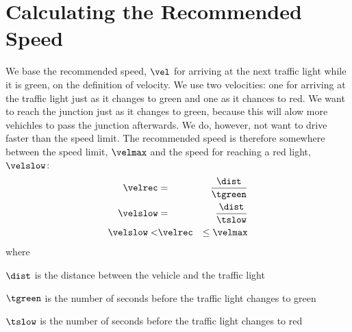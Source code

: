 \section{Calculating the Recommended Speed}\label{sec:Math}

We base the recommended speed, $\vel$ for arriving at the next traffic light while it is green, on the definition of velocity.
We use two velocities: one for arriving at the traffic light just as it changes to green and one as it chances to red.
We want to reach the junction just as it changes to green, because this will alow more vehichles to pass the junction afterwards.
We do, however, not want to drive faster than the speed limit.
The recommended speed is therefore somewhere between the speed limit, $\velmax$ and the speed for reaching a red light, $\velslow$:
\begin{eqnarray}
\velrec &=& \frac{\dist}{\tgreen}\label{eq:Math:h}\\
\velslow &=& \frac{\dist}{\tslow}\nonumber\\
\velslow < &\velrec& \leq \velmax\label{eq:Math:recSpeed}
\end{eqnarray}
where
\vspace{-5mm}
\begin{itemize*}
\item $\dist$ is the distance between the vehicle and the traffic light
\item $\tgreen$ is the number of seconds before the traffic light changes to green
\item $\tslow$ is the number of seconds before the traffic light changes to red
\end{itemize*}

